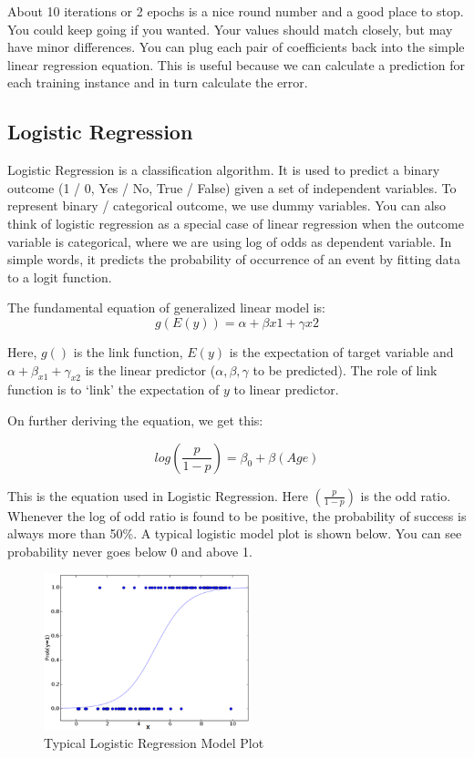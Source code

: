 About 10 iterations or 2 epochs is a nice round number and a good place to stop. You could keep going if you wanted. Your values should match closely, but may have minor differences. You can plug each pair of coefficients back into the simple linear regression equation. This is useful because we can calculate a prediction for each training instance and in turn calculate the error.

\pagebreak

\subsection{Logistic Regression}

Logistic Regression is a classification algorithm. It is used to predict a binary outcome (1 / 0, Yes / No, True / False) given a set of independent variables. To represent binary / categorical outcome, we use dummy variables. You can also think of logistic regression as a special case of linear regression when the outcome variable is categorical, where we are using log of odds as dependent variable. In simple words, it predicts the probability of occurrence of an event by fitting data to a logit function.

The fundamental equation of generalized linear model is:
\[
    g(E(y)) = α + βx1 + γx2    
\]

Here, $g()$ is the link function, $E(y)$ is the expectation of target variable and $α + β_{x1} + γ_{x2}$ is the linear predictor ($α, β, γ$ to be predicted). The role of link function is to ‘link’ the expectation of $y$ to linear predictor.

On further deriving the equation, we get this:

\[
    log(\frac{p}{1 - p}) = \beta_{0} + \beta(Age)
\]

This is the equation used in Logistic Regression. Here $(\frac{p}{1-p})$ is the odd ratio. Whenever the log of odd ratio is found to be positive, the probability of success is always more than 50\%. A typical logistic model plot is shown below. You can see probability never goes below 0 and above 1.

\begin{figure}[H]
    \centering
    \includegraphics[width=6cm]{images/logistic-regression-plot.png}
    \caption{Typical Logistic Regression Model Plot}
\end{figure}

